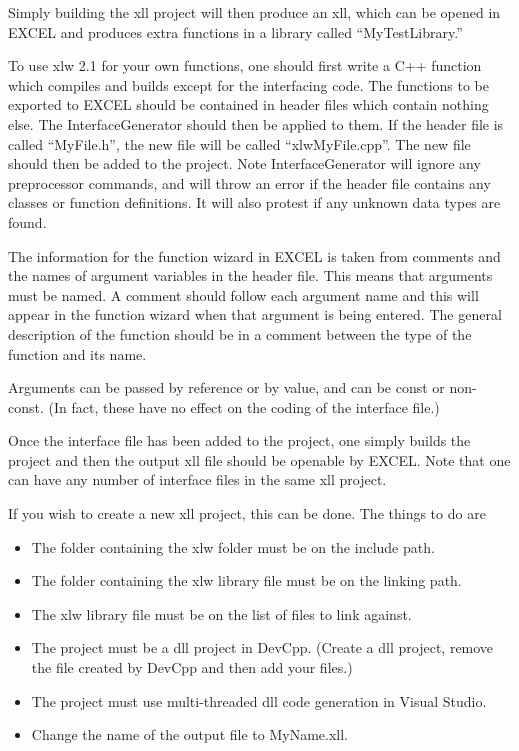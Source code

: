 \documentclass[12pt,reqno]{amsart}
\numberwithin{equation}{section}
\numberwithin{figure}{section}
\begin{document}
Simply building the xll project will then produce an xll, which can be
opened in EXCEL and produces extra functions in a library called
``MyTestLibrary.'' 

To use xlw 2.1 for your own functions, one should first write a C++ function
which compiles and builds except for the interfacing code. The functions to be
exported to EXCEL should be contained in header files which contain nothing
else. The InterfaceGenerator should then be applied to them. If the header file
is called ``MyFile.h'', the new file will be called ``xlwMyFile.cpp''. The new
file should then be added to the project. Note InterfaceGenerator will ignore
any preprocessor commands, and will throw an error if the header file contains
any classes or function definitions. It will also protest if any unknown data
types are found. 

The information for the function wizard in EXCEL is taken from comments and the
names of argument variables in the header file. This means that arguments must
be named. A comment should follow each argument name and this will appear in
the function wizard when that argument is being entered. The general
description of the function should be in a comment between the type of the
function and its name. 

Arguments can be passed by reference or by value, and can be const or
non-const. (In fact, these have no effect on the coding of the interface file.)

Once  the interface file has been added to the project, one simply builds the
project and then the output xll file should be openable by EXCEL. Note that one
can have any number of interface files in the same xll project. 

If you wish to create a new xll project, this can be done. The things
to do are 
\begin{itemize}
\item The folder containing the xlw folder must be on the include path.
\item The folder containing the xlw library file must be on the linking
  path.
\item The xlw library file must be on the list of files to link
  against.
\item The project must be a dll project in DevCpp. (Create a dll
  project, remove the file created by DevCpp and then add your files.) 
\item The project must use multi-threaded dll code generation in
  Visual Studio. 
\item Change the name of the output file to MyName.xll. 
\end{itemize}
\end{document}
